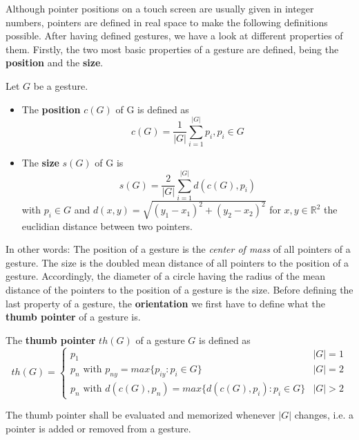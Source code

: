Although pointer positions on a touch screen are usually given in integer numbers, pointers are defined in real space to make the following definitions possible. After having defined gestures, we have a look at different properties of them. Firstly, the two most basic properties of a gesture are defined, being the \textbf{position} and the \textbf{size}.

\begin{defn}
	Let $G$ be a gesture.
	
\begin{itemize}
	\item The \textbf{position} $c(G)$ of G is defined as
	\begin{equation}
	c(G) = \frac{1}{|G|}\sum_{i=1}^{|G|}p_i, p_i \in G
	\end{equation}
	
	\item The \textbf{size} $s(G)$ of G is
	\begin{equation}
	s(G) = \frac{2}{|G|}\sum_{i=1}^{|G|} d(c(G), p_i)
	\end{equation}
	with $p_i \in G$ and $d(x, y) = \sqrt{(y_1 - x_1)^2 + (y_2 - x_2)^2}$ for $x, y \in \mathbb{R}^2$ the euclidian distance between two pointers.
\end{itemize}
\end{defn}

In other words: The position of a gesture is the \textit{center of mass} of all pointers of a gesture. The size is the doubled mean distance of all pointers to the position of a gesture. Accordingly, the diameter of a circle having the radius of the mean distance of the pointers to the position of a gesture is the size. Before defining the last property of a gesture, the \textbf{orientation} we first have to define what the \textbf{thumb pointer} of a gesture is.

\begin{defn}
	The \textbf{thumb pointer} $th(G)$ of a gesture $G$ is defined as
	\begin{equation}
	th(G) = \left\{
	\begin{array}{ll}
	p_1 & |G| = 1 \\
	p_n \text{ with } p_{ny} = max\{p_{iy} : p_i \in G\} & |G| = 2 \\
	p_n \text{ with } d(c(G), p_n) = max\{ d(c(G), p_i) : p_i \in G \}& |G| > 2
	\end{array}
	\right.
	\end{equation}
	
The thumb pointer shall be evaluated and memorized whenever $|G|$ changes, i.e. a pointer is added or removed from a gesture.
\end{defn}

